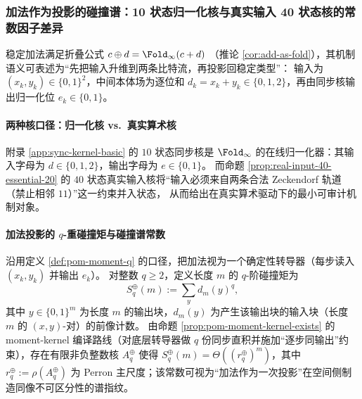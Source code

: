 \subsubsection{加法作为投影的碰撞谱：10 状态归一化核与真实输入 40 状态核的常数因子差异}
\label{app:real-input-40-addition-collision-spectrum}

稳定加法满足折叠公式
\(
c\oplus d=\Fold_\infty(c+d)
\)
（推论 \ref{cor:add-as-fold}），其机制语义可表述为“先把输入升维到两条比特流，再投影回稳定类型”：
输入为 \((x_k,y_k)\in\{0,1\}^2\)，中间本体场为逐位和 \(d_k=x_k+y_k\in\{0,1,2\}\)，再由同步核输出归一化位 \(e_k\in\{0,1\}\)。

\paragraph{两种核口径：归一化核 vs.\ 真实算术核}
附录 \ref{app:sync-kernel-basic} 的 $10$ 状态同步核是 \(\Fold_\infty\) 的在线归一化器：其输入字母为 \(d\in\{0,1,2\}\)，输出字母为 \(e\in\{0,1\}\)。
而命题 \ref{prop:real-input-40-essential-20} 的 \(40\) 状态真实输入核将“输入必须来自两条合法 Zeckendorf 轨道（禁止相邻 \(11\)）”这一约束并入状态，
从而给出在真实算术驱动下的最小可审计机制对象。

\paragraph{加法投影的 \texorpdfstring{$q$}{q}-重碰撞矩与碰撞谱常数}
沿用定义 \ref{def:pom-moment-q} 的口径，把加法视为一个确定性转导器（每步读入 \((x_k,y_k)\) 并输出 \(e_k\)）。
对整数 \(q\ge 2\)，定义长度 \(m\) 的 \(q\)-阶碰撞矩为
\[
S_q^{\oplus}(m):=\sum_{y} d_m(y)^q,
\]
其中 \(y\in\{0,1\}^m\) 为长度 \(m\) 的输出块，\(d_m(y)\) 为产生该输出块的输入块（长度 \(m\) 的 \((x,y)\)-对）的前像计数。
由命题 \ref{prop:pom-moment-kernel-exists} 的 moment-kernel 编译路线（对底层转导器做 \(q\) 份同步直积并施加“逐步同输出”约束），存在有限非负整数核 \(A_q^{\oplus}\) 使得
\(
S_q^{\oplus}(m)=\Theta((r_q^{\oplus})^m)
\)，其中
\(
r_q^{\oplus}:=\rho(A_q^{\oplus})
\)
为 Perron 主尺度；该常数可视为“加法作为一次投影”在空间侧制造同像不可区分性的谱指纹。

